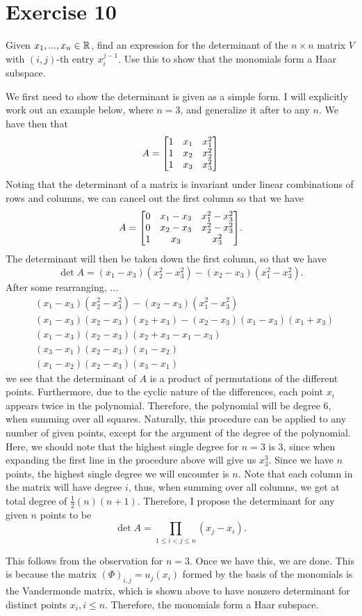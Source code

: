 \newpage
\section{Exercise 10}
Given $x_1, ..., x_n \in \mathbb{R}$, find an expression for the determinant of the $n\times n$ matrix $V$ with $(i, j)$-th entry $x_i^{j-1}$. Use this to show that the monomials form a Haar subspace.
\partbreak
\begin{solution}

    We first need to show the determinant is given as a simple form. I will explicitly work out an example below, where $n = 3$, and generalize it after to any $n$. We have then that 
    \[A =\mqty[1&x_1&x_1^2\\1&x_2&x_2^2\\1&x_3&x_3^2]\]
    Noting that the determinant of a matrix is invariant under linear combinations of rows and columns, we can cancel out the first column so that we have
    \[A = \mqty[0&x_1 - x_3&x_1^2 - x_3^2\\0&x_2 - x_3&x_2^2 - x_3^2\\1&x_3&x_3^2].\]
    The determinant will then be taken down the first column, so that we have
    \[\det A = (x_1 - x_3)(x_2^2 - x_3^2) - (x_2 - x_3)(x_1^2 - x_3^2).\]
    After some rearranging, ...
    \begin{align*}
        &(x_1 - x_3)(x_2^2 - x_3^2) - (x_2 - x_3)(x_1^2 - x_3^2)\\
        &(x_1 - x_3)(x_2 - x_3)(x_2 + x_3) - (x_2 - x_3)(x_1 - x_3)(x_1 + x_3)\\
        &(x_1 - x_3)(x_2 - x_3)(x_2 + x_3 - x_1 - x_3)\\
        &(x_3 - x_1)(x_2 - x_3)(x_1 - x_2)\\
        &(x_1 - x_2)(x_2 - x_3)(x_3 - x_1)
    \end{align*}
    we see that the determinant of $A$ is a product of permutations of the different points. Furthermore, due to the cyclic nature of the differences, each point $x_i$ appears twice in the polynomial. Therefore, the polynomial will be degree 6, when summing over all squares. Naturally, this procedure can be applied to any number of given points, except for the argument of the degree of the polynomial. Here, we should note that the highest single degree for $n = 3$ is 3, since when expanding the first line in the procedure above will give us $x_3^3$. Since we have $n$ points, the highest single degree we will encounter is $n$. Note that each column in the matrix will have degree $i$, thus, when summing over all columns, we get at total degree of $\frac{1}{2}(n)(n+1)$. Therefore, I propose the determinant for any given $n$ points to be 
    \[\det A = \prod_{1 \leq i < j \leq n} (x_j - x_i).\]

    This follows from the observation for $n = 3$. Once we have this, we are done. This is because the matrix $(\Phi)_{i, j} = u_j(x_i)$ formed by the basis of the monomials is the Vandermonde matrix, which is shown above to have nonzero determinant for distinct points $x_i, i \leq n$. Therefore, the monomials form a Haar subspace. 
\end{solution}


